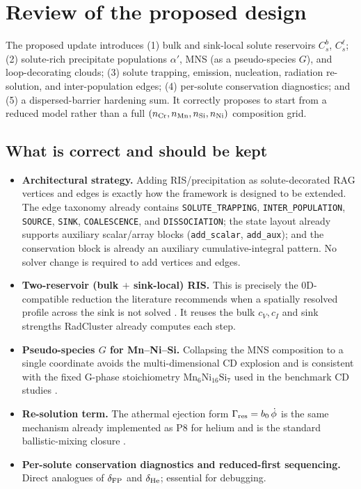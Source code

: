 \documentclass[11pt]{article}
\newcommand{\cv}{c_{V}}
\newcommand{\ci}{c_{I}}
\newcommand{\code}[1]{\texttt{#1}}
\begin{document}
\section{Review of the proposed design}
The proposed update introduces (1) bulk and sink-local solute reservoirs
$C_s^{b}$, $C_s^{\ell}$; (2) solute-rich precipitate populations $\alpha'$,
MNS (as a pseudo-species $G$), and loop-decorating clouds; (3) solute trapping,
emission, nucleation, radiation re-solution, and inter-population edges;
(4) per-solute conservation diagnostics; and (5) a dispersed-barrier hardening
sum. It correctly proposes to start from a reduced model rather than a full
$(n_{\rm Cr},n_{\rm Mn},n_{\rm Si},n_{\rm Ni})$ composition grid.

\subsection{What is correct and should be kept}
\begin{itemize}[leftmargin=1.4em]
\item \textbf{Architectural strategy.} Adding RIS/precipitation as
solute-decorated RAG vertices and edges is exactly how the framework is
designed to be extended. The edge taxonomy already contains
\code{SOLUTE\_TRAPPING}, \code{INTER\_POPULATION}, \code{SOURCE}, \code{SINK},
\code{COALESCENCE}, and \code{DISSOCIATION}; the state layout already supports
auxiliary scalar/array blocks (\code{add\_scalar}, \code{add\_aux}); and the
conservation block is already an auxiliary cumulative-integral pattern. No
solver change is required to add vertices and edges.
\item \textbf{Two-reservoir (bulk $+$ sink-local) RIS.} This is precisely the
0D-compatible reduction the literature recommends when a spatially resolved
profile across the sink is not solved \citep{Hu2021,Oplinger2026}. It reuses
the bulk $\cv,\ci$ and sink strengths RadCluster already computes each step.
\item \textbf{Pseudo-species $G$ for Mn--Ni--Si.} Collapsing the MNS
composition to a single coordinate avoids the multi-dimensional CD explosion
and is consistent with the fixed G-phase stoichiometry $\mathrm{Mn_6Ni_{16}Si_7}$
used in the benchmark CD studies \citep{Ke2018mns,Ke2018fm}.
\item \textbf{Re-solution term.} The athermal ejection form
$\Gamma_{\rm res}=b_0\,\dot\phi$ is the same mechanism already implemented as
P8 for helium and is the standard ballistic-mixing closure
\citep{NelsonHudsonMazey1972,Ke2019flux}.
\item \textbf{Per-solute conservation diagnostics and reduced-first
sequencing.} Direct analogues of $\delta_{\rm FP}$ and $\delta_{\rm He}$;
essential for debugging.
\end{itemize}
\end{document}
